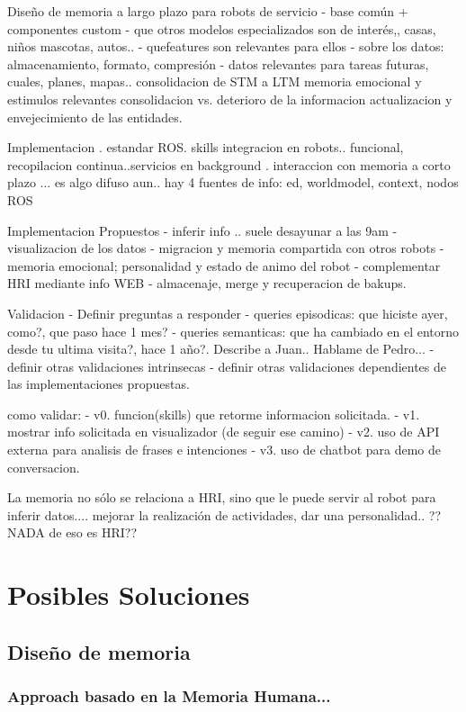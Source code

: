 \documentclass[12pt,letterpaper,spanish]{article}
\begin{document}
Diseño de memoria a largo plazo para robots de servicio
- base com\'un + componentes custom
- que otros modelos especializados son de inter\'es,, casas, ni\~nos mascotas, autos..
- quefeatures son relevantes para ellos
- sobre los datos: almacenamiento, formato, compresi\'on
- datos relevantes para tareas futuras, cuales, planes, mapas..
consolidacion de STM a LTM
memoria emocional y estimulos relevantes
consolidacion vs. deterioro de la informacion
actualizacion y envejecimiento de las entidades.


Implementacion
. estandar ROS. skills
integracion en robots.. funcional, recopilacion continua..servicios en background
. interaccion con memoria a corto plazo ... es algo difuso aun.. hay 4 fuentes de info: ed, worldmodel, context, nodos ROS

Implementacion Propuestos
- inferir info .. suele desayunar a las 9am
- visualizacion de los datos
- migracion y memoria compartida con otros robots
- memoria emocional; personalidad y estado de animo del robot
- complementar HRI mediante info WEB
- almacenaje, merge y recuperacion de bakups.

Validacion
- Definir preguntas a responder
- queries episodicas: que hiciste ayer, como?, que paso hace 1 mes?
- queries semanticas: que ha cambiado en el entorno desde tu ultima visita?, hace 1 a\~no?. Describe a Juan.. Hablame de Pedro...
- definir otras validaciones intrinsecas
- definir otras validaciones dependientes de las implementaciones propuestas.

como validar:
- v0. funcion(skills) que retorme informacion solicitada.
- v1. mostrar info solicitada en visualizador (de seguir ese camino)
- v2. uso de API externa para analisis de frases e intenciones
- v3. uso de chatbot para demo de conversacion.


La memoria no s\'olo se relaciona a HRI, sino que le puede servir al robot para inferir datos.... mejorar la realizaci\'on de actividades, dar una personalidad.. ?? NADA de eso es HRI??


\section{Posibles Soluciones}

\subsection{Dise\~no de memoria}

\subsubsection{Approach basado en la Memoria Humana...}
\end{document}
